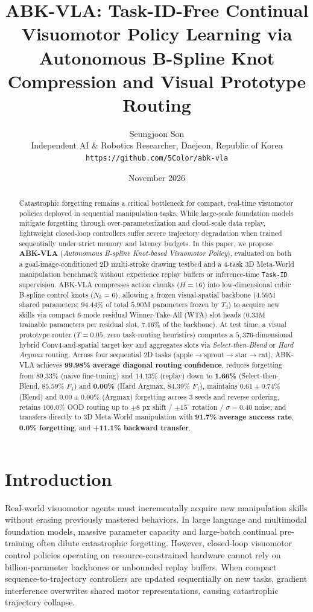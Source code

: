 \documentclass[10pt,twocolumn]{article}
\title{\textbf{ABK-VLA: Task-ID-Free Continual Visuomotor Policy Learning via Autonomous B-Spline Knot Compression and Visual Prototype Routing}}
\author{
  Seungjoon Son \\
  Independent AI \& Robotics Researcher, Daejeon, Republic of Korea \\
  \texttt{https://github.com/5Color/abk-vla}
}
\date{November 2026}
\begin{document}
\maketitle

\begin{abstract}
Catastrophic forgetting remains a critical bottleneck for compact, real-time visuomotor policies deployed in sequential manipulation tasks. While large-scale foundation models mitigate forgetting through over-parameterization and cloud-scale data replay, lightweight closed-loop controllers suffer severe trajectory degradation when trained sequentially under strict memory and latency budgets. In this paper, we propose \textbf{ABK-VLA} (\textit{Autonomous B-spline Knot-based Visuomotor Policy}), evaluated on both a goal-image-conditioned 2D multi-stroke drawing testbed and a 4-task 3D Meta-World manipulation benchmark without experience replay buffers or inference-time \texttt{Task-ID} supervision. ABK-VLA compresses action chunks ($H=16$) into low-dimensional cubic B-spline control knots ($N_k=6$), allowing a frozen visual-spatial backbone ($4.59\text{M}$ shared parameters; $94.44\%$ of total $5.90\text{M}$ parameters frozen by $T_3$) to acquire new skills via compact 6-mode residual Winner-Take-All (WTA) slot heads ($0.33\text{M}$ trainable parameters per residual slot, $7.16\%$ of the backbone). At test time, a visual prototype router ($T=0.05$, zero task-routing heuristics) computes a $5{,}376$-dimensional hybrid Conv4-and-spatial target key and aggregates slots via \textit{Select-then-Blend} or \textit{Hard Argmax} routing. Across four sequential 2D tasks ($\text{apple} \rightarrow \text{sprout} \rightarrow \text{star} \rightarrow \text{cat}$), ABK-VLA achieves \textbf{99.98\% average diagonal routing confidence}, reduces forgetting from $89.33\%$ (naive fine-tuning) and $14.13\%$ (replay) down to \textbf{1.66\%} (Select-then-Blend, $85.59\%$ $F_1$) and \textbf{0.00\%} (Hard Argmax, $84.39\%$ $F_1$), maintains $0.61\pm 0.74\%$ (Blend) and $0.00\pm 0.00\%$ (Argmax) forgetting across 3 seeds and reverse ordering, retains $100.0\%$ OOD routing up to $\pm 8\text{ px}$ shift / $\pm 15^\circ$ rotation / $\sigma=0.40$ noise, and transfers directly to 3D Meta-World manipulation with \textbf{91.7\% average success rate}, \textbf{0.0\% forgetting}, and \textbf{+11.1\% backward transfer}.
\end{abstract}

\section{Introduction}
Real-world visuomotor agents must incrementally acquire new manipulation skills without erasing previously mastered behaviors. In large language and multimodal foundation models, massive parameter capacity and large-batch continual pre-training often dilute catastrophic forgetting. However, closed-loop visuomotor control policies operating on resource-constrained hardware cannot rely on billion-parameter backbones or unbounded replay buffers. When compact sequence-to-trajectory controllers are updated sequentially on new tasks, gradient interference overwrites shared motor representations, causing catastrophic trajectory collapse.
\end{document}
